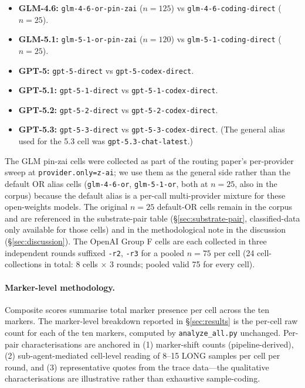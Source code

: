 \documentclass[11pt,a4paper]{article}
\begin{document}
\begin{itemize}[leftmargin=2em, itemsep=0.3em]
    \item \begin{sloppypar} \textbf{GLM-4.6:} \texttt{glm-4-6\allowbreak-or\allowbreak-pin-zai} ($n{=}125$) vs \texttt{glm-4-6\allowbreak-coding\allowbreak-direct} ($n{=}25$). \end{sloppypar}
    \item \begin{sloppypar} \textbf{GLM-5.1:} \texttt{glm-5-1\allowbreak-or\allowbreak-pin-zai} ($n{=}120$) vs \texttt{glm-5-1\allowbreak-coding\allowbreak-direct} ($n{=}25$). \end{sloppypar}
    \item \textbf{GPT-5:} \texttt{gpt-5\allowbreak-direct} vs \texttt{gpt-5\allowbreak-codex\allowbreak-direct}.
    \item \textbf{GPT-5.1:} \texttt{gpt-5-1\allowbreak-direct} vs \texttt{gpt-5-1\allowbreak-codex\allowbreak-direct}.
    \item \textbf{GPT-5.2:} \texttt{gpt-5-2\allowbreak-direct} vs \texttt{gpt-5-2\allowbreak-codex\allowbreak-direct}.
    \item \textbf{GPT-5.3:} \texttt{gpt-5-3\allowbreak-direct} vs \texttt{gpt-5-3\allowbreak-codex\allowbreak-direct}. (The general alias used for the 5.3 cell was \texttt{gpt-5.3\allowbreak-chat\allowbreak-latest}.)
\end{itemize}

The GLM pin-zai cells were collected as part of the routing paper's per-provider sweep \citep{tenner2026routing} at \texttt{provider.only=z-ai}; we use them as the general side rather than the default OR alias cells (\texttt{glm-4-6-or}, \texttt{glm-5-1-or}, both at $n{=}25$, also in the corpus) because the default alias is a per-call multi-provider mixture for these open-weights models. The original $n{=}25$ default-OR cells remain in the corpus and are referenced in the substrate-pair table (\S\ref{sec:substrate-pair}, classified-data only available for those cells) and in the methodological note in the discussion (\S\ref{sec:discussion}). The OpenAI Group F cells are each collected in three independent rounds suffixed \texttt{-r2}, \texttt{-r3} for a pooled $n{=}75$ per cell (24 cell-collections in total: 8 cells $\times$ 3 rounds; pooled valid 75 for every cell).

\paragraph{Marker-level methodology.} Composite scores summarise total marker presence per cell across the ten markers. The marker-level breakdown reported in \S\ref{sec:results} is the per-cell raw count for each of the ten markers, computed by \texttt{analyze\_all.py} unchanged. Per-pair characterisations are anchored in (1) marker-shift counts (pipeline-derived), (2) sub-agent-mediated cell-level reading of 8--15 LONG samples per cell per round, and (3) representative quotes from the trace data---the qualitative characterisations are illustrative rather than exhaustive sample-coding.
\end{document}

